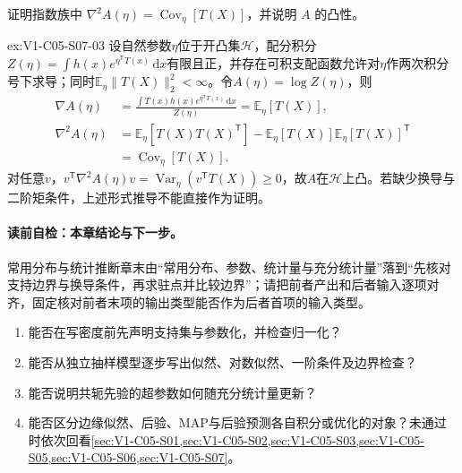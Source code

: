 \begin{SLChapterExercisePairSection}
\begin{exercise}\label{ex:V1-C05-S07-03}
证明指数族中 $\nabla^2A(\eta)=\operatorname{Cov}_\eta[T(X)]$，并说明 $A$ 的凸性。
\end{exercise}
\label{sol:V1-C05-S07-03}
\begin{chapterexercisesolution}{ex:V1-C05-S07-03}
设自然参数$\eta$位于开凸集$\mathcal H$，配分积分$Z(\eta)=\int h(x)e^{\eta^{\mathsf T}T(x)}\,\mathrm dx$有限且正，并存在可积支配函数允许对$\eta$作两次积分号下求导；同时$\mathbb E_\eta\|T(X)\|_2^2<\infty$。令$A(\eta)=\log Z(\eta)$，则
\[
\begin{aligned}
\nabla A(\eta)
&=\frac{\int T(x)h(x)e^{\eta^{\mathsf T}T(x)}\,\mathrm dx}{Z(\eta)}
=\mathbb E_\eta[T(X)],\\
\nabla^2A(\eta)
&=\mathbb E_\eta[T(X)T(X)^{\mathsf T}]
-\mathbb E_\eta[T(X)]\mathbb E_\eta[T(X)]^{\mathsf T}\\
&=\operatorname{Cov}_\eta[T(X)].
\end{aligned}
\]
对任意$v$，$v^{\mathsf T}\nabla^2A(\eta)v=\operatorname{Var}_\eta(v^{\mathsf T}T(X))\ge0$，故$A$在$\mathcal H$上凸。若缺少换导与二阶矩条件，上述形式推导不能直接作为证明。
\end{chapterexercisesolution}

\end{SLChapterExercisePairSection}

\paragraph{读前自检：本章结论与下一步。}常用分布与统计推断章末由“常用分布、参数、统计量与充分统计量”落到“先核对支持边界与换导条件，再求驻点并比较边界”；请把前者产出和后者输入逐项对齐，固定核对前者末项的输出类型能否作为后者首项的输入类型。\par

\begin{SLCompactClosure}
\label{struct:V1-C05-CH36}

\label{struct:V1-C05-CH37}
\begin{selfcheckbox}
\begin{enumerate}[leftmargin=2.2em]
  \item 能否在写密度前先声明支持集与参数化，并检查归一化？
  \item 能否从独立抽样模型逐步写出似然、对数似然、一阶条件及边界检查？
  \item 能否说明共轭先验的超参数如何随充分统计量更新？
  \item 能否区分边缘似然、后验、MAP与后验预测各自积分或优化的对象？未通过时依次回看\cref{sec:V1-C05-S01,sec:V1-C05-S02,sec:V1-C05-S03,sec:V1-C05-S05,sec:V1-C05-S06,sec:V1-C05-S07}。
\end{enumerate}
\end{selfcheckbox}
\end{SLCompactClosure}
